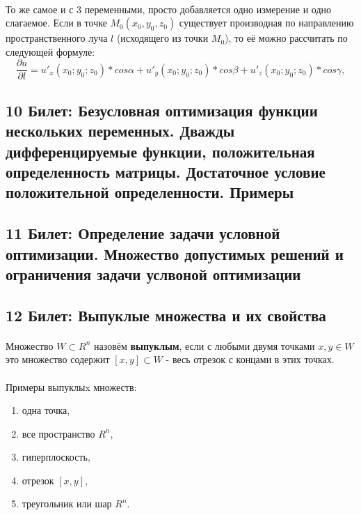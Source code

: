 \documentclass[14pt, letterpaper]{article}
\begin{document}
\paragraph{}
То же самое и с 3 переменными, просто добавляется одно измерение и одно слагаемое.
Если в точке $M_{0}(x_{0}, y_{0}, z_{0})$ существует производная по направлению пространственного луча $l$ (исходящего из точки $M_{0}$), то её можно рассчитать по следующей формуле:
    $$\frac{\partial u}{\partial l} = u\prime_{x}(x_{0}; y_{0}; z_{0})*cos\alpha + u\prime_{y}(x_{0}; y_{0}; z_{0})*cos\beta + u\prime_{z}(x_{0}; y_{0}; z_{0})*cos\gamma, $$

\newpage
\subsection{10 Билет: Безусловная оптимизация функции нескольких переменных. Дважды дифференцируемые функции, 
положительная определенность матрицы. Достаточное условие положительной определенности. Примеры}

\newpage
\subsection{11 Билет: Определение задачи условной оптимизации. Множество допустимых решений и ограничения задачи 
услвоной оптимизации}

\newpage
\subsection{12 Билет: Выпуклые множества и их свойства}
\paragraph{}
Множество $W \subset R^{n}$ назовём \textbf{выпуклым}, если с любыми двумя точками $x, y \in W$ это множество содержит $[x, y] \subset W$ - весь отрезок с концами в этих точках.

\paragraph{}
Примеры выпуклыx множеств:
\begin{enumerate}
    \item одна точка, 
    \item все пространство $R^{n}$,
    \item гиперплоскость,
    \item отрезок $[x, y]$,
    \item треугольник или шар $R^{n}$.
\end{enumerate}
\end{document}
